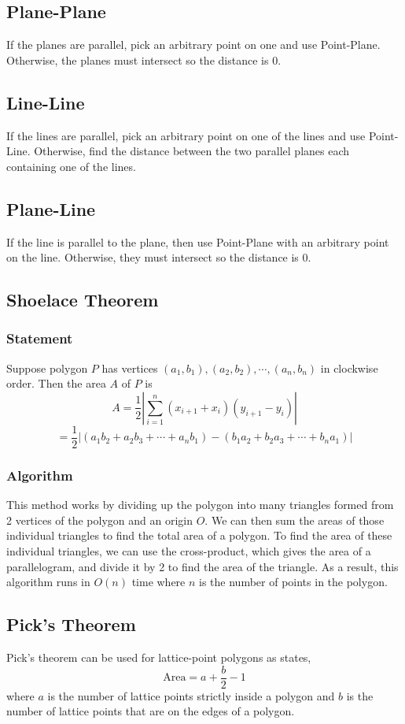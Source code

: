 \documentclass{article}
\begin{document}
\subsection{Plane-Plane}
If the planes are parallel, pick an arbitrary point on one and use Point-Plane. Otherwise, the planes must intersect so the distance is $0$.
\subsection{Line-Line}
If the lines are parallel, pick an arbitrary point on one of the lines and use Point-Line. Otherwise, find the distance between the two parallel planes each containing one of the lines.
\subsection{Plane-Line}
If the line is parallel to the plane, then use Point-Plane with an arbitrary point on the line. Otherwise, they must intersect so the distance is $0$.

\subsection{Shoelace Theorem}
\subsubsection{Statement}
Suppose polygon $P$ has vertices $(a_{1},b_{1}),(a_{2},b_{2}),\cdots,(a_{n},b_{n})$ in clockwise order. Then the area $A$ of $P$ is
$$A=\frac{1}{2}|\sum_{i=1}^{n}(x_{i+1}+x_{i})(y_{i+1}-y_{i})|$$
$$=\frac{1}{2}|(a_{1}b_{2}+a_{2}b_{3}+\cdots+a_{n}b_{1})-(b_{1}a_{2}+b_{2}a_{3}+\cdots+b_{n}a_{1})|$$

\subsubsection{Algorithm}
This method works by dividing up the polygon into many triangles formed from 2 vertices of the polygon and an origin $O$. We can then sum the areas of those individual triangles to find the total area of a polygon. To find the area of these individual triangles, we can use the cross-product, which gives the area of a parallelogram, and divide it by 2 to find the area of the triangle. As a result, this algorithm runs in $O(n)$ time where $n$ is the number of points in the polygon.

\subsection{Pick's Theorem}
Pick's theorem can be used for lattice-point polygons as states,
$$\text{Area}=a + \frac{b}{2} - 1$$
where $a$ is the number of lattice points strictly inside a polygon and $b$ is the number of lattice points that are on the edges of a polygon.
\end{document}

